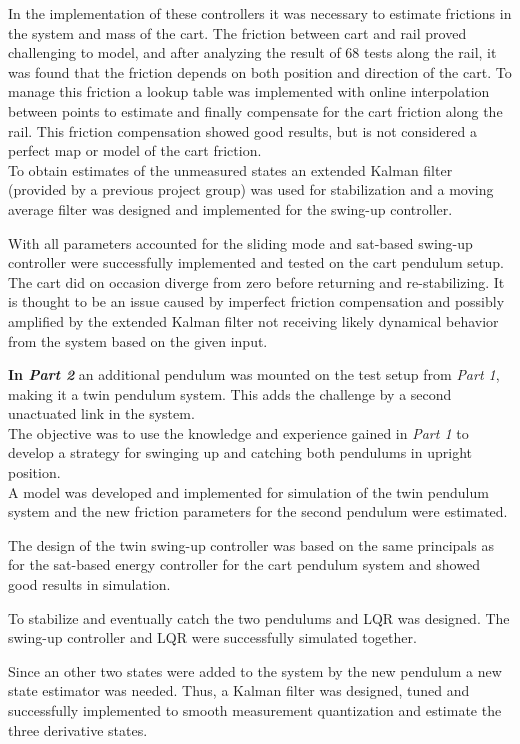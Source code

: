 In the implementation of these controllers it was necessary to estimate frictions in the system and mass of the cart. The friction between cart and rail proved challenging to model, and after analyzing the result of 68 tests along the rail, it was found that the friction depends on both position and direction of the cart. To manage this friction a lookup table was implemented with online interpolation between points to estimate and finally compensate for the cart friction along the rail. This friction compensation showed good results, but is not considered a perfect map or model of the cart friction.\\
To obtain estimates of the unmeasured states an extended Kalman filter (provided by a previous project group) was used for stabilization and a moving average filter was designed and implemented for the swing-up controller.

With all parameters accounted for the sliding mode and sat-based swing-up controller were successfully implemented and tested on the cart pendulum setup. The cart did on occasion diverge from zero before returning and re-stabilizing. It is thought to be an issue caused by imperfect friction compensation and possibly amplified by the extended Kalman filter not receiving likely dynamical behavior from the system based on the given input.

\textbf{In \textit{Part 2}} an additional pendulum was mounted on the test setup from \textit{Part 1}, making it a twin pendulum system. This adds the challenge by a second unactuated link in the system.\\
The objective was to use the knowledge and experience gained in \textit{Part 1} to develop a strategy for swinging up and catching both pendulums in upright position.\\
A model was developed and implemented for simulation of the twin pendulum system and the new friction parameters for the second pendulum were estimated.

The design of the twin swing-up controller was based on the same principals as for the sat-based energy controller for the cart pendulum system and showed good results in simulation.

To stabilize and eventually catch the two pendulums and LQR was designed. The swing-up controller and LQR were successfully simulated together.

Since an other two states were added to the system by the new pendulum a new state estimator was needed. Thus, a Kalman filter was designed, tuned and successfully implemented to smooth measurement quantization and estimate the three derivative states.

